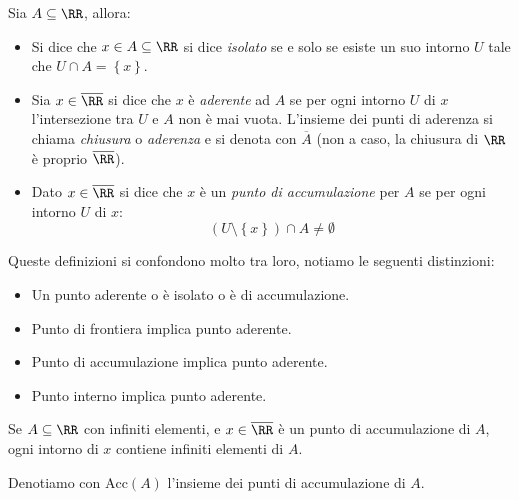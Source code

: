 \documentclass[11pt]{scrartcl}
\begin{document}
	\begin{definition}
		Sia $A\subseteq\RR$, allora:
		\begin{itemize}
			\item Si dice che $x\in A\subseteq\RR$ si dice \textit{isolato} se e solo se esiste un suo intorno $U$ tale che $U\cap A=\left\{x\right\}$.
			\item Sia $x\in\overline{\RR}$ si dice che $x$ è \textit{aderente} ad $A$ se per ogni intorno $U$ di $x$ l'intersezione tra $U$ e $A$ non è mai vuota. L'insieme dei punti di aderenza si chiama \textit{chiusura} o \textit{aderenza} e si denota con $\overline{A}$ (non a caso, la chiusura di $\RR$ è proprio $\overline{\RR}$).
			\item Dato $x\in\overline{\RR}$ si dice che $x$ è un \textit{punto di accumulazione} per $A$ se per ogni intorno $U$ di $x$:
			$$\left(U\setminus \left\{x\right\}\right)\cap A\ne\emptyset$$
		\end{itemize}
	\end{definition}
	
	\begin{remark}
		Queste definizioni si confondono molto tra loro, notiamo le seguenti distinzioni:
		\begin{itemize}
			\item Un punto aderente o è isolato o è di accumulazione.
			\item Punto di frontiera implica punto aderente.
			\item Punto di accumulazione implica punto aderente.
			\item Punto interno implica punto aderente.
		\end{itemize}
	\end{remark}
	
	\begin{proposition}
		Se $A\subseteq\RR$ con infiniti elementi, e $x\in\overline{\RR}$ è un punto di accumulazione di $A$, ogni intorno di $x$ contiene infiniti elementi di $A$.
	\end{proposition}
	Denotiamo con $\text{Acc}(A)$ l'insieme dei punti di accumulazione di $A$.
	
	
\end{document}
